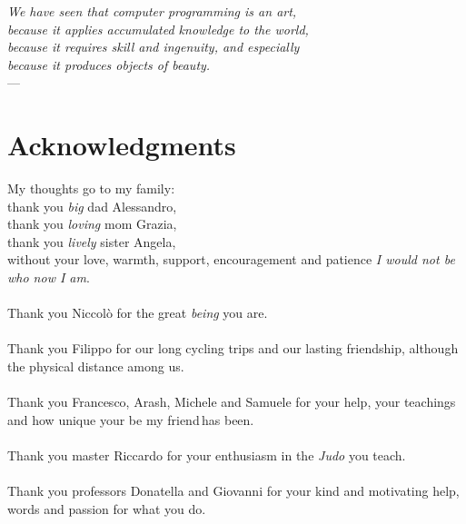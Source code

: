 
\begin{flushright}{\slshape    
    We have seen that computer programming is an art, \\ 
    because it applies accumulated knowledge to the world, \\ 
    because it requires skill and ingenuity, and especially \\
    because it produces objects of beauty.} \\ \medskip
    ---  \citep{knuth:1974}
\end{flushright}



\bigskip

\begingroup
\let\clearpage\relax
\let\cleardoublepage\relax
\let\cleardoublepage\relax

\chapter*{Acknowledgments}

My thoughts go to my family: \\
\indent thank you \emph{big} dad Alessandro, \\
\indent thank you \emph{loving} mom Grazia,\\
\indent thank you  \emph{lively} sister Angela, \\
without your love, warmth, support, encouragement 
and patience \emph{I would not be who now I am}.
\\\\
Thank you Niccol\`o for the great \emph{being} you are.
\\\\
Thank you Filippo for our long cycling trips and our lasting
friendship, although the physical distance among us.
\\\\
Thank you Francesco, Arash, Michele and Samuele for your help,
your teachings and how unique your \flqq be my friend\frqq\,has been.
\\\\
Thank you master Riccardo for your enthusiasm in the \emph{Judo} you teach.
\\\\
Thank you professors Donatella and Giovanni for your kind and motivating help,
words and passion for what you do.

